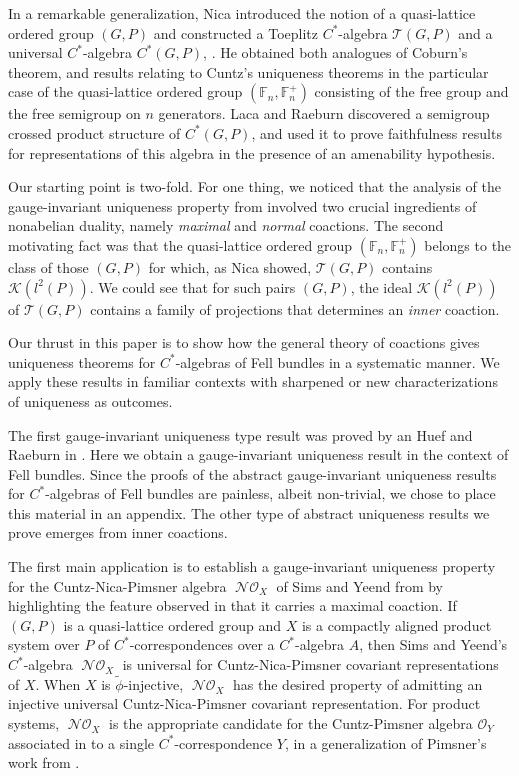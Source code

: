 \documentclass[12pt]{amsart}
\theoremstyle{plain}
\theoremstyle{remark}
\theoremstyle{definition}
\numberwithin{equation}{section}
\theoremstyle{plain}
\theoremstyle{definition}
\theoremstyle{remark}
\begin{document}
In a remarkable generalization, Nica introduced the notion of a quasi-lattice ordered group $(G, P)$ and constructed a Toeplitz
$C^*$-algebra ${\mathcal T}(G, P)$ and a universal $C^*$-algebra $C^*(G, P)$, \cite{N}. He obtained both analogues of Coburn's theorem, and
results relating to Cuntz's uniqueness theorems in the particular case of the quasi-lattice ordered group
$({{\mathbb{{F}}}}_n, {{\mathbb{{F}}}}_n^+)$ consisting of the free group and the free semigroup on $n$ generators. Laca and Raeburn \cite{LacR1} discovered a
semigroup crossed product structure of $C^*(G, P)$, and used it to prove faithfulness results for representations of this
algebra in the presence of an amenability hypothesis.

Our starting point is two-fold. For one thing, we noticed that the analysis of the gauge-invariant uniqueness
property from \cite{CLSV} involved two crucial ingredients of nonabelian duality, namely \emph{maximal} and \emph{normal} coactions. The
second motivating fact was that the quasi-lattice ordered group $({{\mathbb{{F}}}}_n, {{\mathbb{{F}}}}_n^+)$ belongs to the class of
those $(G, P)$ for which, as Nica showed,
${\mathcal T}(G, P)$ contains ${\mathcal K}(l^2(P))$. We could see that for such pairs $(G, P)$, the ideal ${\mathcal K}(l^2(P))$ of ${\mathcal T}(G, P)$
contains a family of projections that determines an \emph{inner} coaction.

Our thrust in this paper is to show how the general theory of coactions gives uniqueness theorems for
$C^*$-algebras of Fell bundles in a systematic manner. We  apply these results in familiar contexts
with sharpened or new characterizations of uniqueness as outcomes.

The first gauge-invariant uniqueness type result was proved by an Huef and Raeburn in \cite{anHR}.
Here we obtain a gauge-invariant uniqueness result in the context of Fell bundles. Since the proofs of the
abstract gauge-invariant uniqueness results for
$C^*$-algebras of Fell bundles are painless, albeit non-trivial, we chose to place this
material in an appendix. The other type of abstract uniqueness results we prove emerges from inner coactions.

The first main application is to establish a gauge-invariant uniqueness property  for
the Cuntz-Nica-Pimsner algebra ${\operatorname{\mathcal{NO}}_{\!{X}}}$ of Sims and Yeend
from \cite{SY} by highlighting  the feature observed in \cite{CLSV} that it
carries a maximal coaction. If $(G, P)$ is a quasi-lattice ordered
group and $X$ is a compactly aligned
product system over $P$ of $C^*$-correspondences over a $C^*$-algebra $A$, then Sims and Yeend's
$C^*$-algebra ${\operatorname{\mathcal{NO}}_{\!{X}}}$  is universal for Cuntz-Nica-Pimsner covariant representations
of $X$. When $X$ is $\tilde{\phi}$-injective, ${\operatorname{\mathcal{NO}}_{\!{X}}}$ has the desired property of admitting an injective universal Cuntz-Nica-Pimsner
covariant representation. For product systems, ${\operatorname{\mathcal{NO}}_{\!{X}}}$ is the appropriate candidate for
the Cuntz-Pimsner algebra ${\mathcal O}_Y$ associated in \cite{Ka} to
 a single $C^*$-correspondence $Y$, in a generalization of Pimsner's work from \cite{P}.
\end{document}
